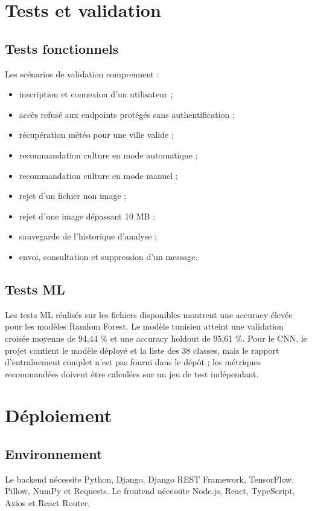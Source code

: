 \documentclass[12pt,a4paper]{report}
\begin{document}
\chapter{Tests et validation}

\section{Tests fonctionnels}
Les scénarios de validation comprennent :
\begin{itemize}[noitemsep]
  \item inscription et connexion d'un utilisateur ;
  \item accès refusé aux endpoints protégés sans authentification ;
  \item récupération météo pour une ville valide ;
  \item recommandation culture en mode automatique ;
  \item recommandation culture en mode manuel ;
  \item rejet d'un fichier non image ;
  \item rejet d'une image dépassant 10 MB ;
  \item sauvegarde de l'historique d'analyse ;
  \item envoi, consultation et suppression d'un message.
\end{itemize}

\section{Tests ML}
Les tests ML réalisés sur les fichiers disponibles montrent une accuracy élevée pour les modèles Random Forest. Le modèle tunisien atteint une validation croisée moyenne de 94,44 \% et une accuracy holdout de 95,61 \%. Pour le CNN, le projet contient le modèle déployé et la liste des 38 classes, mais le rapport d'entraînement complet n'est pas fourni dans le dépôt ; les métriques recommandées doivent être calculées sur un jeu de test indépendant.

\chapter{Déploiement}

\section{Environnement}
Le backend nécessite Python, Django, Django REST Framework, TensorFlow, Pillow, NumPy et Requests. Le frontend nécessite Node.js, React, TypeScript, Axios et React Router.
\end{document}
